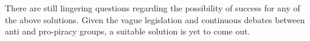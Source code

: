 There are still lingering questions regarding the possibility of success for
any of the above solutions. Given the vague legislation and continuous debates
between anti and pro-piracy groups, a suitable solution is yet to come out.


%
